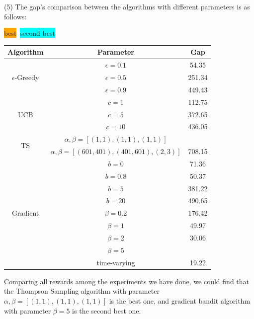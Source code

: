 (5) The gap's comparison between the algorithms with different parameters is as follows:
\begin{table}[!htbp]
    \centering
    \colorbox{orange}{best}\ \colorbox{cyan}{second best} \\
    \begin{tabular}{c|c|c}
    \toprule
    \textbf{Algorithm} & \textbf{Parameter} & \textbf{Gap} \\
    \midrule
    \multirow{3}{*}{\centering $\epsilon$-Greedy}   & $\epsilon=0.1$ & 54.35  \\
                                                    & $\epsilon=0.5$ & 251.34 \\
                                                    & $\epsilon=0.9$ & 449.43 \\
    \midrule
    \multirow{3}{*}{\centering UCB} & $c=1$  & 112.75 \\
                                    & $c=5$  & 372.65 \\
                                    & $c=10$ & 436.05 \\
    \midrule
    \multirow{2}{*}{\centering TS}  & $\alpha,\beta=[(1,1),(1,1),(1,1)]$         & \cellcolor{orange}{14.36}  \\
                                    & $\alpha,\beta=[(601,401),(401,601),(2,3)]$ & 708.15 \\
    \midrule
    \multirow{10}{*}{\centering Gradient}   & $b=0$   & 71.36  \\
                                            & $b=0.8$ & 50.37  \\
                                            & $b=5$   & 381.22 \\
                                            & $b=20$  & 490.65 \\
    \cline{2-3}
    & $\beta=0.2$ & 176.42 \\
    & $\beta=1$   & 49.97  \\
    & $\beta=2$   & 30.06  \\
    & $\beta=5$   & \cellcolor{cyan}{16.57} \\
    \cline{2-3}
    & time-varying & 19.22 \\
    \bottomrule
    \end{tabular}
\end{table}

Comparing all rewards among the experiments we have done, we could find that the Thompson Sampling algorithm with parameter $\alpha,\beta=[(1,1),(1,1),(1,1)]$ is the best one, and gradient bandit algorithm with parameter $\beta=5$ is the second best one.

